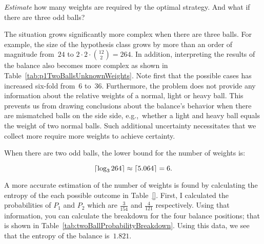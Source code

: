\begin{subproblem}
  \textit{Estimate} how many weights are required by the optimal strategy.  And what if there are three odd balls?
\end{subproblem}



  \noindent
  
  The situation grows significantly more complex when there are three balls.  For example, the size of the hypothesis class grows by more than an order of magnitude from~$24$ to ${2\cdot2\cdot\binom{12}{2} = 264}.$ In addition, interpreting the results of the balance also becomes more complex as shown in Table~\ref{tab:p1TwoBallsUnknownWeights}.  Note first that the possible cases has increased six-fold from~6 to~36.  Furthermore, the problem does not provide any information about the relative weights of a normal, light or heavy ball.  This prevents us from drawing conclusions about the balance's behavior when there are mismatched balls on the side side, e.g.,~whether a light and heavy ball equals the weight of two normal balls.  Such additional uncertainty necessitates that we collect more require more weights to achieve certainty.
  
  When there are two odd balls, the lower bound for the number of weights is:
  
  \[ \lceil \log_3 264 \rceil \approx \lceil 5.064 \rceil = 6\text{.} \]
  
  A more accurate estimation of the number of weights is found by calculating the entropy of the each possible outcome in Table~\ref{}.  First, I calculated the probabilities of $P_{1}$ and $P_{2}$ which are $\frac{3}{154}$ and $\frac{4}{121}$ respectively.  Using that information, you can calculate the breakdown for the four balance positions; that is shown in Table~\ref{tab:twoBallProbabilityBreakdown}.  Using this data, we see that the entropy of the balance is~$1.821$.
  
